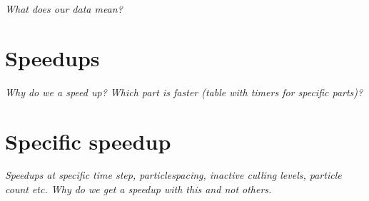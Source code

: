 \documentclass[../../main.tex]{subfiles}
\begin{document}
\textit{What does our data mean?}


\section{Speedups}
\textit{Why do we a speed up? Which part is faster (table with timers for specific parts)?}


\section{Specific speedup}
\textit{Speedups at specific time step, particlespacing, inactive culling levels, particle count etc. Why do we get a speedup with this and not others. }
\end{document}
